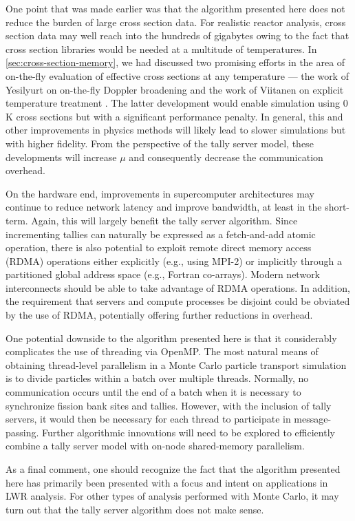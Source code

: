 One point that was made earlier was that the algorithm presented here does not
reduce the burden of large cross section data. For realistic reactor analysis,
cross section data may well reach into the hundreds of gigabytes owing to the
fact that cross section libraries would be needed at a multitude of
temperatures. In \autoref{sec:cross-section-memory}, we had discussed two
promising efforts in the area of on-the-fly evaluation of effective cross
sections at any temperature --- the work of Yesilyurt on on-the-fly Doppler
broadening \cite{nse-yesilyurt-2012} and the work of Viitanen on explicit
temperature treatment \cite{nse-viitanen-2012}. The latter development would
enable simulation using 0 K cross sections but with a significant performance
penalty. In general, this and other improvements in physics methods will likely
lead to slower simulations but with higher fidelity. From the perspective of the
tally server model, these developments will increase $\mu$ and consequently
decrease the communication overhead.

On the hardware end, improvements in supercomputer architectures may continue to
reduce network latency and improve bandwidth, at least in the short-term. Again,
this will largely benefit the tally server algorithm. Since incrementing tallies
can naturally be expressed as a fetch-and-add atomic operation, there is also
potential to exploit remote direct memory access (RDMA) operations either
explicitly (e.g., using MPI-2) or implicitly through a partitioned global
address space (e.g., Fortran co-arrays). Modern network interconnects should be
able to take advantage of RDMA operations. In addition, the requirement that
servers and compute processes be disjoint could be obviated by the use of RDMA,
potentially offering further reductions in overhead.

One potential downside to the algorithm presented here is that it considerably
complicates the use of threading via OpenMP. The most natural means of obtaining
thread-level parallelism in a Monte Carlo particle transport simulation is to
divide particles within a batch over multiple threads. Normally, no
communication occurs until the end of a batch when it is necessary to
synchronize fission bank sites and tallies. However, with the inclusion of tally
servers, it would then be necessary for each thread to participate in
message-passing. Further algorithmic innovations will need to be explored to
efficiently combine a tally server model with on-node shared-memory parallelism.

As a final comment, one should recognize the fact that the algorithm presented
here has primarily been presented with a focus and intent on applications in LWR
analysis. For other types of analysis performed with Monte Carlo, it may turn
out that the tally server algorithm does not make sense.
